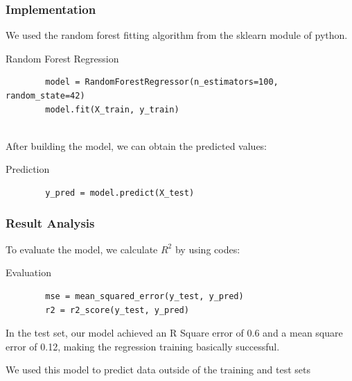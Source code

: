 \documentclass[a4paper]{article}
\begin{document}
\subsubsection{Implementation}
We used the random forest fitting algorithm from the sklearn module of python.\\
\begin{listing}[htb]\caption{Random Forest Regression}\label{code:processdweet}
    \begin{verbatim}
        model = RandomForestRegressor(n_estimators=100, random_state=42)
        model.fit(X_train, y_train)
    \end{verbatim} 
\end{listing}
\\[0.6em]
After building the model, we can obtain the predicted values:\\
\begin{listing}[h]\caption{Prediction}\label{code:pppd}
    \begin{verbatim}
        y_pred = model.predict(X_test)
    \end{verbatim}
\end{listing}


\subsubsection{Result Analysis}
To evaluate the model, we calculate $R^2$ by using codes:\\

\begin{listing}[htb]\caption{Evaluation}\label{code:pppd}
    \begin{verbatim}
        mse = mean_squared_error(y_test, y_pred)
        r2 = r2_score(y_test, y_pred)
    \end{verbatim}
\end{listing}
In the test set, our model achieved an R Square error of 0.6 and a mean square error of 0.12, making the regression training basically successful.


We used this model to predict data outside of the training and test sets
\end{document}
